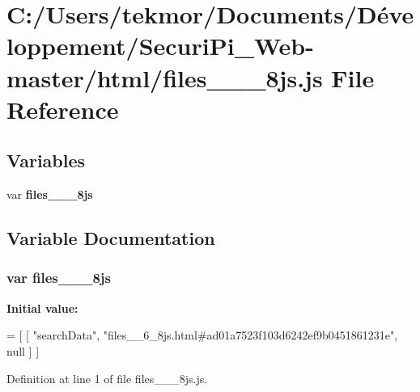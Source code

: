 \section{C\+:/\+Users/tekmor/\+Documents/\+Développement/\+Securi\+Pi\+\_\+\+Web-\/master/html/files\+\_\+\+\_\+\_\+8js.js File Reference}
\label{files____6__8js_8js}
\subsection*{Variables}
\begin{DoxyCompactItemize}
\item 
var {\bf files\+\_\+\+\_\+\_\+8js}
\end{DoxyCompactItemize}


\subsection{Variable Documentation}
\subsubsection[{files\+\_\+\+\_\+6\+\_\+8js}]{\setlength{\rightskip}{0pt plus 5cm}var files\+\_\+\+\_\+\_\+8js}\label{files____6__8js_8js_a99fa82755b312a664761ffbd12577fdc}
{\bfseries Initial value\+:}
\begin{DoxyCode}
=
[
    [ \textcolor{stringliteral}{"searchData"}, \textcolor{stringliteral}{"files\_\_6\_8js.html#ad01a7523f103d6242ef9b0451861231e"}, null ]
]
\end{DoxyCode}


Definition at line 1 of file files\+\_\+\+\_\+\_\+8js.\+js.

